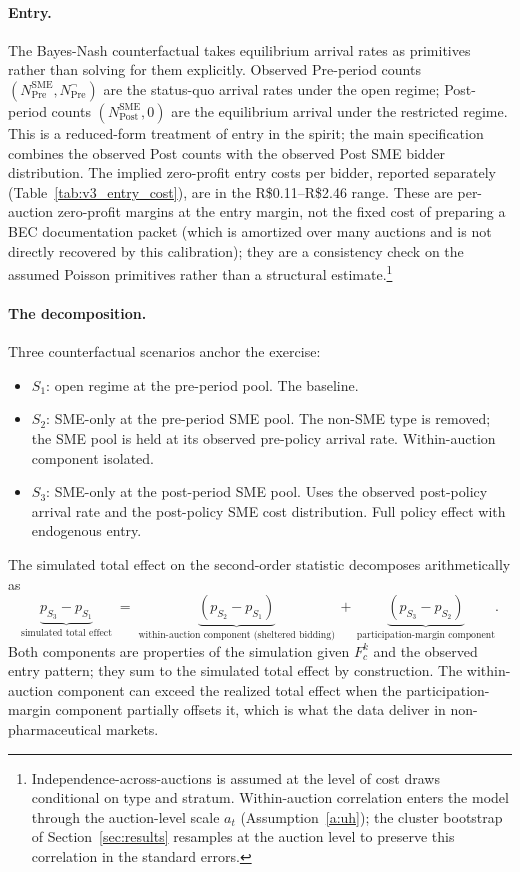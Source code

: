 \paragraph{Entry.} The Bayes-Nash counterfactual takes equilibrium arrival rates as primitives rather than solving for them explicitly. Observed Pre-period counts $(N^{\text{SME}}_{\text{Pre}}, N^{\neg}_{\text{Pre}})$ are the status-quo arrival rates under the open regime; Post-period counts $(N^{\text{SME}}_{\text{Post}}, 0)$ are the equilibrium arrival under the restricted regime. This is a reduced-form treatment of entry in the \citet{atheyseira2011} spirit; the main specification combines the observed Post counts with the observed Post SME bidder distribution. The implied zero-profit entry costs per bidder, reported separately (Table~\ref{tab:v3_entry_cost}), are in the R\$0.11--R\$2.46 range. These are per-auction zero-profit margins at the entry margin, not the fixed cost of preparing a BEC documentation packet (which is amortized over many auctions and is not directly recovered by this calibration); they are a consistency check on the assumed Poisson primitives rather than a structural estimate.\footnote{Independence-across-auctions is assumed at the level of cost draws conditional on type and stratum. Within-auction correlation enters the model through the auction-level scale $a_t$ (Assumption~\ref{a:uh}); the cluster bootstrap of Section~\ref{sec:results} resamples at the auction level to preserve this correlation in the standard errors.}

\paragraph{The decomposition.} Three counterfactual scenarios anchor the exercise:
\begin{itemize}
\item $S_1$: open regime at the pre-period pool. The baseline.
\item $S_2$: SME-only at the pre-period SME pool. The non-SME type is removed; the SME pool is held at its observed pre-policy arrival rate. Within-auction component isolated.
\item $S_3$: SME-only at the post-period SME pool. Uses the observed post-policy arrival rate and the post-policy SME cost distribution. Full policy effect with endogenous entry.
\end{itemize}
The simulated total effect on the second-order statistic decomposes arithmetically as
\begin{equation}
\underbrace{p_{S_3} - p_{S_1}}_{\text{simulated total effect}}
\;=\; \underbrace{(p_{S_2} - p_{S_1})}_{\text{within-auction component (sheltered bidding)}}
   \,+\, \underbrace{(p_{S_3} - p_{S_2})}_{\text{participation-margin component}}.
\end{equation}
Both components are properties of the simulation given $F_c^k$ and the observed entry pattern; they sum to the simulated total effect by construction. The within-auction component can exceed the realized total effect when the participation-margin component partially offsets it, which is what the data deliver in non-pharmaceutical markets.

